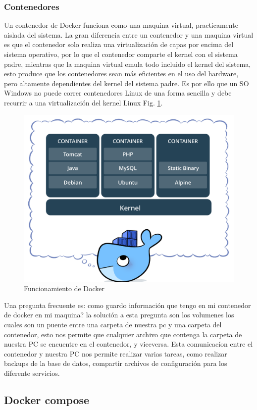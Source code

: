 \subsubsection*{Contenedores}


Un contenedor de Docker funciona como una maquina virtual, practicamente aislada del sistema. La gran diferencia entre un contenedor y una maquina virtual es que el contenedor solo realiza una virtualización de capas por encima del sistema operativo, por lo que el contenedor comparte el kernel con el sistema padre, mientras que la maquina virtual emula todo incluido el kernel del sistema, esto produce que los contenedores sean más eficientes en el uso del hardware, pero altamente dependientes del kernel del sistema padre. Es por ello que un SO Windows no puede correr contenedores Linux de una forma sencilla y debe recurrir a una virtualización del kernel Linux Fig. \ref{fig:docker-funcinamiento}.


\begin{figure}
        \centering
        \includegraphics[width=.5\textwidth]{imgs/contenedores-docker.png}
        \caption{Funcionamiento de Docker}
        \label{fig:docker-funcinamiento}

\end{figure}

Una pregunta frecuente es: como guardo información que tengo en mi contenedor de docker en mi maquina? la solución a esta pregunta son los volumenes los cuales son un puente entre una carpeta de nuestra pc y una carpeta del contenedor, esto nos permite que cualquier archivo que contenga la carpeta de nuestra PC se encuentre en el contenedor, y viceversa. Esta comunicacíon entre el contenedor y nuestra PC nos permite realizar varias tareas, como realizar backups de la base de datos, compartir archivos de configuración para los diferente servicios.

\subsection{Docker compose}

